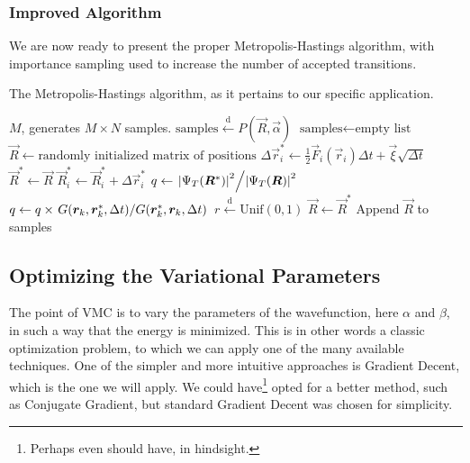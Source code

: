 \documentclass[twocolumn]{article}
\newcommand{\setfrom}{\overset{\mathrm{d}}{\leftarrow}}
\begin{document}
\subsubsection{Improved Algorithm}
We are now ready to present the proper Metropolis-Hastings algorithm, with
importance sampling used to increase the number of accepted transitions.

\begin{algorithm}[H]
    \caption{The Metropolis-Hastings algorithm, as it
    pertains to our specific application.}
    \label{alg:metropolis-importance}
    \begin{algorithmic}[1]
        \REQUIRE $M$, generates $M\times N$ samples.
        \ENSURE $\text{samples} \setfrom P(\vec R, \vec\alpha)$
        \STATE $\text{samples} \leftarrow \text{empty list}$
        \STATE $\vec R \leftarrow \text{randomly initialized matrix of positions}$
                \STATE $\Delta\vec r_i^* \leftarrow \frac{1}{2}\vec
                F_i(\vec r_i)\Delta t + \vec \xi\sqrt{\Delta t}$
                \STATE $\vec R^*\leftarrow \vec R $
                \STATE $\vec R^*_i \leftarrow \vec R^{*}_i+ \Delta \vec r_i^*$ 
                \STATE $q \leftarrow \flatfrac{\abs{\Psi_T(\vec R^*)}^2}{\abs{\Psi_T(\vec R)}^2}$
                \STATE $q \leftarrow q \times \flatfrac{G(\vec r_k, \vec r_k^*,
                    \Delta t)}{G(\vec r_k^*, \vec r_k, \Delta t)}$
                \STATE $r \setfrom \text{Unif}(0, 1)$
                    \STATE $\vec R \leftarrow \vec R^*$
                \ENDIF
                \STATE Append $\vec R$ to samples
            \ENDFOR
        \ENDFOR
    \end{algorithmic}
\end{algorithm}

\subsection{Optimizing the Variational Parameters}

The point of VMC is to vary the parameters of the wavefunction, here $\alpha$
and $\beta$, in such a way that the energy is minimized. This is in other words
a classic optimization problem, to which we can apply one of the many available
techniques. One of the simpler and more intuitive approaches is Gradient Decent,
which is the one we will apply. We could have\footnote{Perhaps even should have,
in hindsight.} opted for a better method, such as Conjugate Gradient, but
standard Gradient Decent was chosen for simplicity.
\end{document}
